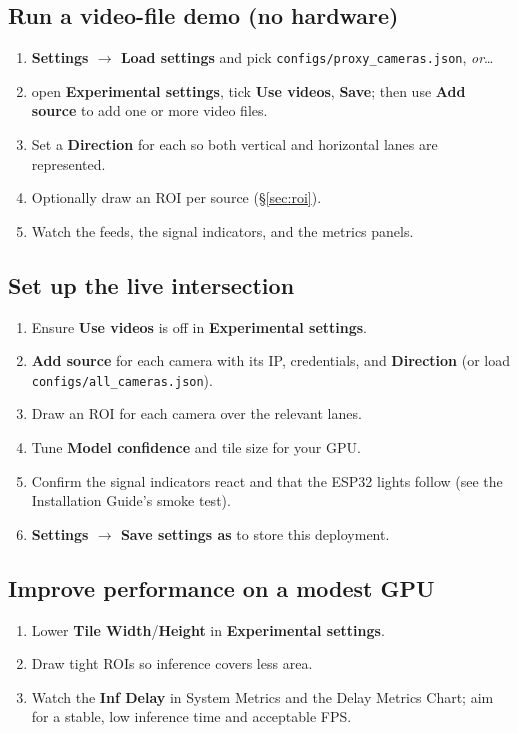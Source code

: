 \documentclass[11pt]{article}
\newcommand{\code}[1]{\texttt{#1}}
\newcommand{\ui}[1]{\textbf{#1}}
\begin{document}
\subsection{Run a video-file demo (no hardware)}
\begin{enumerate}[nosep]
  \item \ui{Settings $\rightarrow$ Load settings} and pick
        \code{configs/proxy\_cameras.json}, \emph{or}\dots
  \item open \ui{Experimental settings}, tick \ui{Use videos}, \ui{Save}; then
        use \ui{Add source} to add one or more video files.
  \item Set a \ui{Direction} for each so both vertical and horizontal lanes are
        represented.
  \item Optionally draw an ROI per source (\S\ref{sec:roi}).
  \item Watch the feeds, the signal indicators, and the metrics panels.
\end{enumerate}

\subsection{Set up the live intersection}
\begin{enumerate}[nosep]
  \item Ensure \ui{Use videos} is off in \ui{Experimental settings}.
  \item \ui{Add source} for each camera with its IP, credentials, and
        \ui{Direction} (or load \code{configs/all\_cameras.json}).
  \item Draw an ROI for each camera over the relevant lanes.
  \item Tune \ui{Model confidence} and tile size for your GPU.
  \item Confirm the signal indicators react and that the ESP32 lights follow
        (see the Installation Guide's smoke test).
  \item \ui{Settings $\rightarrow$ Save settings as} to store this deployment.
\end{enumerate}

\subsection{Improve performance on a modest GPU}
\begin{enumerate}[nosep]
  \item Lower \ui{Tile Width}/\ui{Height} in \ui{Experimental settings}.
  \item Draw tight ROIs so inference covers less area.
  \item Watch the \ui{Inf Delay} in System Metrics and the Delay Metrics Chart;
        aim for a stable, low inference time and acceptable FPS.
\end{enumerate}
\end{document}
